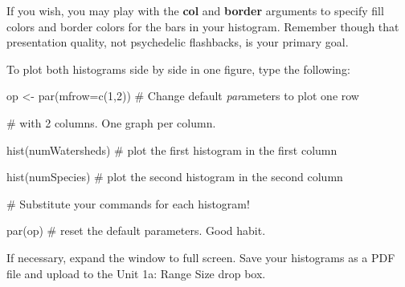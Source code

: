 If you wish, you may play with the \textbf{col} and \textbf{border}
arguments to specify fill colors and border colors for the bars in your
histogram. Remember though that presentation quality, not psychedelic
flashbacks, is your primary goal.

To plot both histograms side by side in one figure, type the following:

op \textless{}- par(mfrow=c(1,2)) \# Change default \emph{par}ameters to
plot one row

\# with 2 columns. One graph per column.

hist(numWatersheds) \# plot the first histogram in the first column

hist(numSpecies) \# plot the second histogram in the second column

\# Substitute your commands for each histogram!

par(op) \# reset the default parameters. Good habit.

If necessary, expand the window to full screen. Save your histograms as
a PDF file and upload to the Unit 1a: Range Size drop box.
